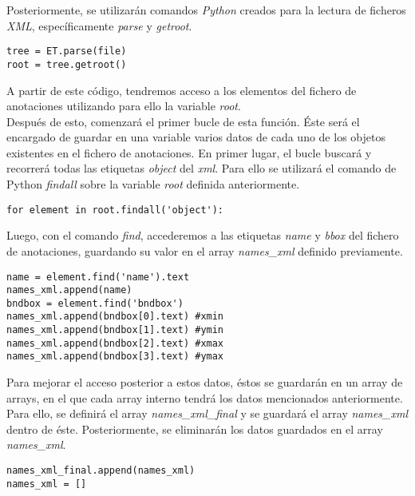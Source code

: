 \documentclass[a4paper, 12pt, spanish, chapterprefix, numbers=noenddot]{book}
\begin{document}
Posteriormente, se utilizarán comandos \textit{Python} creados para la lectura de ficheros \textit{XML}, específicamente \textit{parse} y \textit{getroot}.\\

\begin{lstlisting}[frame=single]
tree = ET.parse(file)
root = tree.getroot()
\end{lstlisting}

A partir de este código, tendremos acceso a los elementos del fichero de anotaciones utilizando para ello la variable \textit{root}.\\

Después de esto, comenzará el primer bucle de esta función. Éste será el encargado de guardar en una variable varios datos de cada uno de los objetos existentes en el fichero de anotaciones. En primer lugar, el bucle buscará y recorrerá todas las etiquetas \textit{object} del \textit{xml}. Para ello se utilizará el comando de Python \textit{findall} sobre la variable \textit{root} definida anteriormente.\\

\begin{lstlisting}[frame=single]
for element in root.findall('object'):
\end{lstlisting}

Luego, con el comando \textit{find}, accederemos a las etiquetas \textit{name} y \textit{bbox} del fichero de anotaciones, guardando su valor en el array \textit{names\_xml} definido previamente.\\

\begin{lstlisting}[frame=single]
name = element.find('name').text
names_xml.append(name)
bndbox = element.find('bndbox')
names_xml.append(bndbox[0].text) #xmin
names_xml.append(bndbox[1].text) #ymin
names_xml.append(bndbox[2].text) #xmax
names_xml.append(bndbox[3].text) #ymax
\end{lstlisting}

Para mejorar el acceso posterior a estos datos, éstos se guardarán en un array de arrays, en el que cada array interno tendrá los datos mencionados anteriormente. Para ello, se definirá el array \textit{names\_xml\_final} y se guardará el array \textit{names\_xml} dentro de éste. Posteriormente, se eliminarán los datos guardados en el array \textit{names\_xml}.

\begin{lstlisting}[frame=single]
names_xml_final.append(names_xml)
names_xml = []
\end{lstlisting}
\end{document}
